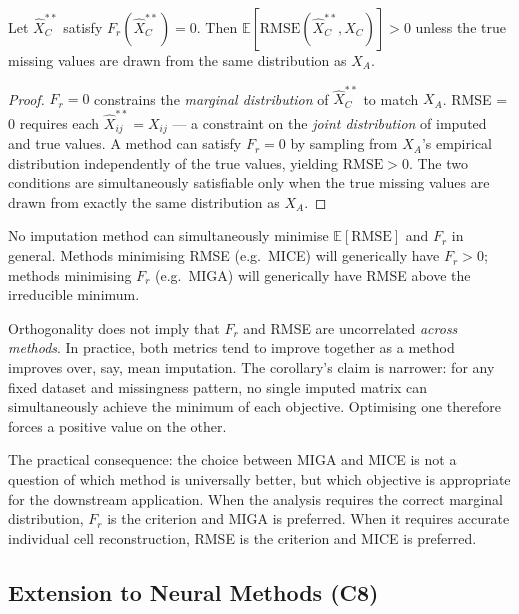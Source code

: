 \begin{proposition}
\label{prop:fr_implies_rmse}
Let $\hat{X}_C^{**}$ satisfy $F_r(\hat{X}_C^{**}) = 0$. Then $\mathbb{E}[\mathrm{RMSE}(\hat{X}_C^{**}, X_C)] > 0$ unless the true missing values are drawn from the same distribution as $X_A$.
\end{proposition}

\begin{proof}
$F_r = 0$ constrains the \emph{marginal distribution} of $\hat{X}_C^{**}$ to match $X_A$. RMSE = 0 requires each $\hat{X}_{ij}^{**} = X_{ij}$ --- a constraint on the \emph{joint distribution} of imputed and true values. A method can satisfy $F_r = 0$ by sampling from $X_A$'s empirical distribution independently of the true values, yielding $\text{RMSE} > 0$. The two conditions are simultaneously satisfiable only when the true missing values are drawn from exactly the same distribution as $X_A$.
\end{proof}

\begin{corollary}
\label{cor:orthogonal}
No imputation method can simultaneously minimise $\mathbb{E}[\mathrm{RMSE}]$ and $F_r$ in general. Methods minimising RMSE (e.g.\ MICE) will generically have $F_r > 0$; methods minimising $F_r$ (e.g.\ MIGA) will generically have RMSE above the irreducible minimum.
\end{corollary}

\begin{remark}
Orthogonality does not imply that $F_r$ and RMSE are uncorrelated \emph{across methods}. In practice, both metrics tend to improve together as a method improves over, say, mean imputation. The corollary's claim is narrower: for any fixed dataset and missingness pattern, no single imputed matrix can simultaneously achieve the minimum of each objective. Optimising one therefore forces a positive value on the other.
\end{remark}

The practical consequence: the choice between MIGA and MICE is not a question of which method is universally better, but which objective is appropriate for the downstream application. When the analysis requires the correct marginal distribution, $F_r$ is the criterion and MIGA is preferred. When it requires accurate individual cell reconstruction, RMSE is the criterion and MICE is preferred.

\subsection{Extension to Neural Methods (C8)}
\label{sec:gain_theory}

